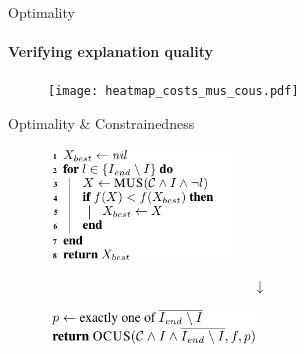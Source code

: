 \documentclass[handout]{beamer}
\begin{document}
\begin{frame}{Optimality}
	\framesubtitle{Verifying explanation quality}
			\begin{figure}
		\texttt{[image: heatmap\_costs\_mus\_cous.pdf]}
	\end{figure}
\end{frame}
	
	
	\begin{frame}{Optimality \& Constrainedness}
				\begin{figure}
			\includegraphics[width=0.45\textwidth]{algo_mus2.png}
		\end{figure}\pause
{\Huge$$\downarrow$$}
	\begin{figure}
		\includegraphics[width=0.5\textwidth]{exactly_one.png}
	\end{figure}
	\end{frame}
	
\end{document}
